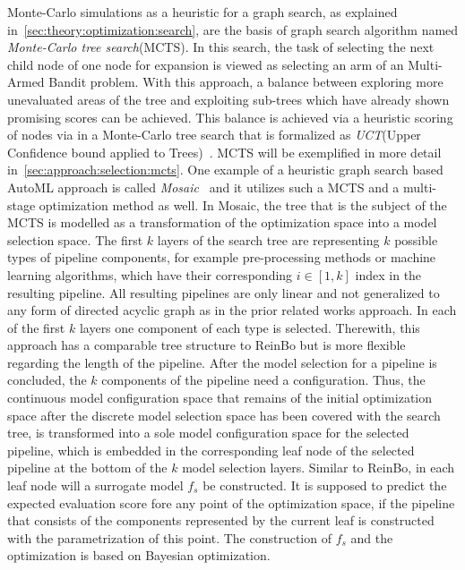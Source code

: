 Monte-Carlo simulations as a heuristic for a graph search, as explained in~\ref{sec:theory:optimization:search}, are the basis of graph search algorithm named \textit{Monte-Carlo tree search}(MCTS).
In this search, the task of selecting the next child node of one node for expansion is viewed as selecting an arm of an Multi-Armed Bandit problem.
With this approach, a balance between exploring more unevaluated areas of the tree and exploiting sub-trees which have already shown promising scores can be achieved.
This balance is achieved via a heuristic scoring of nodes via in a Monte-Carlo tree search that is formalized as \textit{UCT}(Upper Confidence bound applied to Trees)~\cite{Kocsis-UCT}.
MCTS will be exemplified in more detail in~\ref{sec:approach:selection:mcts}.\newline
One example of a heuristic graph search based AutoML approach is called \textit{Mosaic}~\cite{Rakotoarison-Mosaic} and it utilizes such a MCTS and a multi-stage optimization method as well.
In Mosaic, the tree that is the subject of the MCTS is modelled as a transformation of the optimization space into a model selection space.
The first $k$ layers of the search tree are representing $k$ possible types of pipeline components, for example pre-processing methods or machine learning algorithms, which have their corresponding $i \in [1,k]$ index in the resulting pipeline.
All resulting pipelines are only linear and not generalized to any form of directed acyclic graph as in the prior related works approach.
In each of the first $k$ layers one component of each type is selected.
Therewith, this approach has a comparable tree structure to ReinBo but is more flexible regarding the length of the pipeline.\newline
After the model selection for a pipeline is concluded, the $k$ components of the pipeline need a configuration.
Thus, the continuous model configuration space that remains of the initial optimization space after the discrete model selection space has been covered with the search tree, is transformed into a sole model configuration space for the selected pipeline, which is embedded in the corresponding leaf node of the selected pipeline at the bottom of the $k$ model selection layers.
Similar to ReinBo, in each leaf node will a surrogate model $f_s$ be constructed.
It is supposed to predict the expected evaluation score fore any point of the optimization space, if the pipeline that consists of the components represented by the current leaf is constructed with the parametrization of this point.
The construction of $f_s$ and the optimization is based on Bayesian optimization.


